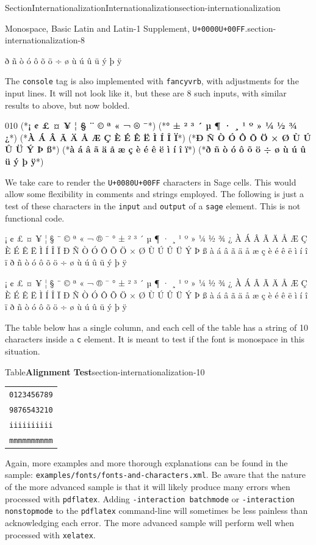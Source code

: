 \documentclass[twoside,10pt,]{article}
\newcommand{\tabularfont}{\relax}
\newcommand{\mono}[1]{\texttt{#1}}
\numberwithin{equation}{section}
\newcommand{\consoleinput}[1]{\textbf{#1}}
\begin{document}
\begin{sectionptx}{Section}{Internationalization}{}{Internationalization}{}{}{section-internationalization}
\begin{paragraphs}{Monospace, Basic Latin and Latin-1 Supplement, \mono{U+0000}\textendash{}\mono{U+00FF}.}{section-internationalization-8}
\begin{preformatted}
ð ñ ò ó ô õ ö ÷ ø ù ú û ü ý þ ÿ
\end{preformatted}
The \mono{console} tag is also implemented with \mono{fancyvrb}, with adjustments for the input lines.  It will not look like it, but these are 8 such inputs, with similar results to above, but now bolded.%
\begin{console}{0}{1}{0}
(*\consoleinput{¡ ¢ £ ¤ ¥ ¦ § ¨ © ª « ¬   ® ¯}*)
(*\consoleinput{° ± ² ³ ´ µ ¶ · ¸ ¹ º » ¼ ½ ¾ ¿}*)
(*\consoleinput{À Á Â Ã Ä Å Æ Ç È É Ê Ë Ì Í Î Ï}*)
(*\consoleinput{Ð Ñ Ò Ó Ô Õ Ö × Ø Ù Ú Û Ü Ý Þ ß}*)
(*\consoleinput{à á â ã ä å æ ç è é ê ë ì í î ï}*)
(*\consoleinput{ð ñ ò ó ô õ ö ÷ ø ù ú û ü ý þ ÿ}*)
\end{console}
We take care to render the \mono{U+0080}\textendash{}\mono{U+00FF} characters in Sage cells.  This would allow some flexibility in comments and strings employed.  The following is just a test of these characters in the \mono{input} and \mono{output} of a \mono{sage} element.  This is not functional code.%
\begin{sageinput}
  ¡ ¢ £ ¤ ¥ ¦ § ¨ © ª « ¬   ® ¯
° ± ² ³ ´ µ ¶ · ¸ ¹ º » ¼ ½ ¾ ¿
À Á Â Ã Ä Å Æ Ç È É Ê Ë Ì Í Î Ï
Ð Ñ Ò Ó Ô Õ Ö × Ø Ù Ú Û Ü Ý Þ ß
à á â ã ä å æ ç è é ê ë ì í î ï
ð ñ ò ó ô õ ö ÷ ø ù ú û ü ý þ ÿ
\end{sageinput}
\begin{sageoutput}
  ¡ ¢ £ ¤ ¥ ¦ § ¨ © ª « ¬   ® ¯
° ± ² ³ ´ µ ¶ · ¸ ¹ º » ¼ ½ ¾ ¿
À Á Â Ã Ä Å Æ Ç È É Ê Ë Ì Í Î Ï
Ð Ñ Ò Ó Ô Õ Ö × Ø Ù Ú Û Ü Ý Þ ß
à á â ã ä å æ ç è é ê ë ì í î ï
ð ñ ò ó ô õ ö ÷ ø ù ú û ü ý þ ÿ
\end{sageoutput}
\end{paragraphs}%
\par\medskip
The table below has a single column, and each cell of the table has a string of 10 characters inside a \mono{c} element.  It is meant to test if the font is monospace in this situation.%
\begin{tableptx}{Table}{\textbf{Alignment Test}}{section-internationalization-10}{}%
\centering%
{\tabularfont%
\begin{tabular}{l}
\mono{0123456789}\tabularnewline[0pt]
\mono{9876543210}\tabularnewline[0pt]
\mono{iiiiiiiiii}\tabularnewline[0pt]
\mono{mmmmmmmmmm}
\end{tabular}
}%
\end{tableptx}%
Again, more examples and more thorough explanations can be found in the sample: \mono{examples/fonts/fonts-and-characters.xml}.  Be aware that the nature of the more advanced sample is that it will likely produce many errors when processed with \mono{pdflatex}.  Adding \mono{-interaction batchmode} or \mono{-interaction nonstopmode} to the \mono{pdflatex} command-line will sometimes be less painless than acknowledging each error.  The more advanced sample will perform well when processed with \mono{xelatex}.%
\end{sectionptx}
\end{document}
